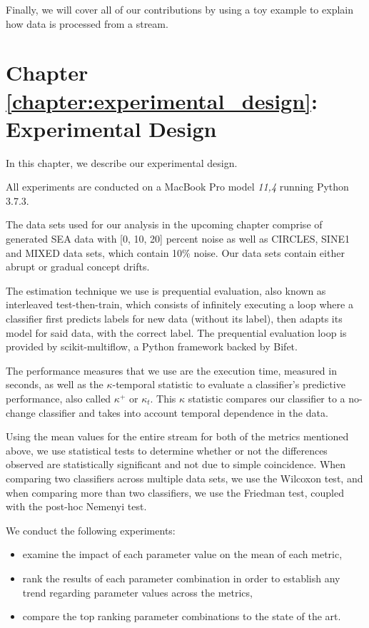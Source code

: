 Finally, we will cover all of our contributions by using a toy example to explain how data is processed from a stream.

\section{Chapter \ref{chapter:experimental_design}: Experimental Design}
In this chapter, we describe our experimental design.

All experiments are conducted on a MacBook Pro model \textit{11,4} running Python 3.7.3.

The data sets used for our analysis in the upcoming chapter comprise of generated SEA data with [0, 10, 20] percent noise as well as CIRCLES, SINE1 and MIXED data sets, which contain 10\% noise. Our data sets contain either abrupt or gradual concept drifts.

The estimation technique we use is prequential evaluation, also known as interleaved test-then-train, which consists of infinitely executing a loop where a classifier first predicts labels for new data (without its label), then adapts its model for said data, with the correct label. The prequential evaluation loop is provided by scikit-multiflow, a Python framework backed by Bifet.

The performance measures that we use are the execution time, measured in seconds, as well as the $\kappa$-temporal statistic to evaluate a classifier's predictive performance, also called $\kappa^+$ or $\kappa_t$. This $\kappa$ statistic compares our classifier to a no-change classifier and takes into account temporal dependence in the data.

Using the mean values for the entire stream for both of the metrics mentioned above, we use statistical tests to determine whether or not the differences observed are statistically significant and not due to simple coincidence. When comparing two classifiers across multiple data sets, we use the Wilcoxon test, and when comparing more than two classifiers, we use the Friedman test, coupled with the post-hoc Nemenyi test.

We conduct the following experiments:
\begin{itemize}
\item  examine the impact of each parameter value on the mean of each metric,
\item rank the results of each parameter combination in order to establish any trend regarding parameter values across the metrics,
\item compare the top ranking parameter combinations to the state of the art.
\end{itemize}

